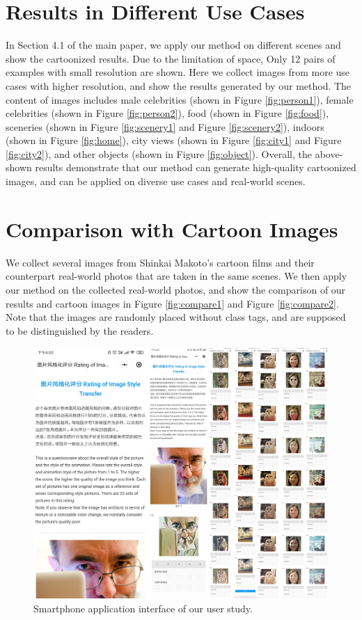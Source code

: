 \documentclass[10pt,twocolumn,letterpaper]{article}
\begin{document}
\section{Results in Different Use Cases}
In Section 4.1 of the main paper, we apply our method on different scenes and show the cartoonized results. Due to the limitation of space, Only 12 pairs of examples with small resolution are shown. Here we collect images from more use cases with higher resolution, and show the results generated by our method. The content of images includes male celebrities (shown in Figure \ref{fig:person1}), female celebrities (shown in Figure \ref{fig:person2}), food (shown in Figure \ref{fig:food}), sceneries (shown in Figure \ref{fig:scenery1} and Figure \ref{fig:scenery2}), indoors (shown in Figure \ref{fig:home}), city views (shown in Figure \ref{fig:city1} and Figure \ref{fig:city2}), and other objects (shown in Figure \ref{fig:object}). Overall, the above-shown results demonstrate that our method can generate high-quality cartoonized images, and can be applied on diverse use cases and real-world scenes.

\section{Comparison with Cartoon Images}
We collect several images from Shinkai Makoto's cartoon films and their counterpart real-world photos that are taken in the same scenes. We then apply our method on the collected real-world photos, and show the comparison of our results and cartoon images in Figure \ref{fig:compare1} and Figure \ref{fig:compare2}. Note that the images are randomly placed without class tags, and are supposed to be distinguished by the readers.

\begin{figure}[t]
\centering
\includegraphics[width=\linewidth]{figures/userstudy_interface.pdf}
\caption{Smartphone application interface of our user study.}
\label{fig:userstudy_interface}
\end{figure}
\end{document}

